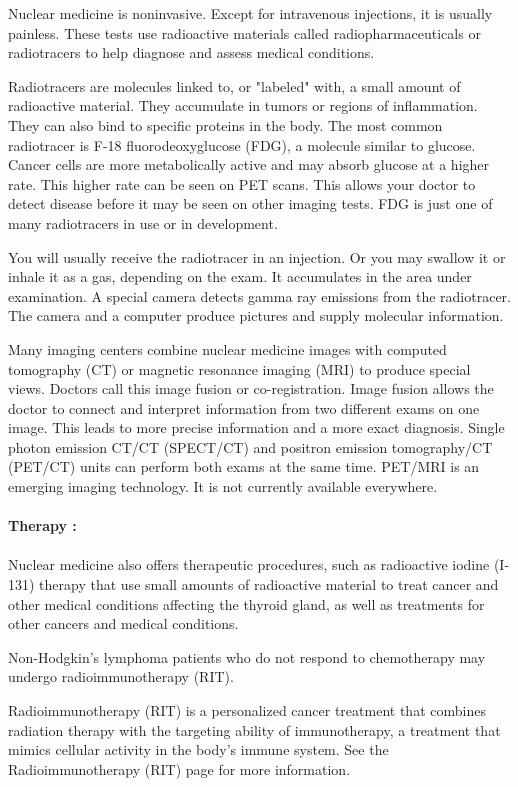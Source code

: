 \documentclass[12pt]{article}
\begin{document}
\noindent Nuclear medicine is noninvasive. Except for intravenous injections, it is usually painless. These tests use radioactive materials called radiopharmaceuticals or radiotracers to help diagnose and assess medical conditions.

\noindent Radiotracers are molecules linked to, or "labeled" with, a small amount of radioactive material. They accumulate in tumors or regions of inflammation. They can also bind to specific proteins in the body. The most common radiotracer is F-18 fluorodeoxyglucose (FDG), a molecule similar to glucose. Cancer cells are more metabolically active and may absorb glucose at a higher rate. This higher rate can be seen on PET scans. This allows your doctor to detect disease before it may be seen on other imaging tests. FDG is just one of many radiotracers in use or in development.

\noindent You will usually receive the radiotracer in an injection. Or you may swallow it or inhale it as a gas, depending on the exam. It accumulates in the area under examination. A special camera detects gamma ray emissions from the radiotracer. The camera and a computer produce pictures and supply molecular information.

 
\noindent Many imaging centers combine nuclear medicine images with computed tomography (CT) or magnetic resonance imaging (MRI) to produce special views. Doctors call this image fusion or co-registration. Image fusion allows the doctor to connect and interpret information from two different exams on one image. This leads to more precise information and a more exact diagnosis. Single photon emission CT/CT (SPECT/CT) and positron emission tomography/CT (PET/CT) units can perform both exams at the same time. PET/MRI is an emerging imaging technology. It is not currently available everywhere.
\noindent 
\\ \\ \textbf{\large Therapy :}
\\\\ Nuclear medicine also offers therapeutic procedures, such as radioactive iodine (I-131) therapy that use small amounts of radioactive material to treat cancer and other medical conditions affecting the thyroid gland, as well as treatments for other cancers and medical conditions.

\noindent Non-Hodgkin's lymphoma patients who do not respond to chemotherapy may undergo radioimmunotherapy (RIT).

\noindent Radioimmunotherapy (RIT) is a personalized cancer treatment that combines radiation therapy with the targeting ability of immunotherapy, a treatment that mimics cellular activity in the body's immune system. See the Radioimmunotherapy (RIT) page for more information.\\
\end{document}
